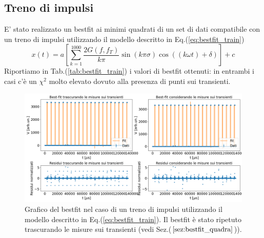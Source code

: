 \documentclass{article}
\begin{document}
    \subsection{Treno di impulsi}
        E' stato realizzato un bestfit ai minimi quadrati
        di un set di dati compatibile con un treno di impulsi utilizzando il modello descritto in Eq.(\ref{eq:bestfit_train})
        \begin{equation}
            x(t) = a \left[\sum_{k=1}^{1000} \frac{2 G(f, f_T)}{k\pi} \sin{\left( k \pi \sigma \right)} \cos{\left((k \omega t) + \delta\right)}\right] + c
        \label{eq:bestfit_train}
        \end{equation}
        Riportiamo in Tab.(\ref{tab:bestfit_train}) i valori di bestfit ottenuti: in entrambi i casi c'è un $\chi^2$
        molto elevato dovuto alla presenza di punti sui transienti.
            \begin{figure}[H]            
                \centering
                \includegraphics[width=1\textwidth]{bestfit_train.png} %
                \caption{Grafico del bestfit nel caso 
                di un treno di impulsi utilizzando il
                 modello descritto in 
                 Eq.(\ref{eq:bestfit_train}).
                  Il bestfit è stato ripetuto 
                  trascurando le misure sui transienti
                  (vedi Sez.($\ref{sez:bestfit_quadra}$)).
                }
                \label{fig:bestfit_train}
            \end{figure}    
\end{document}
